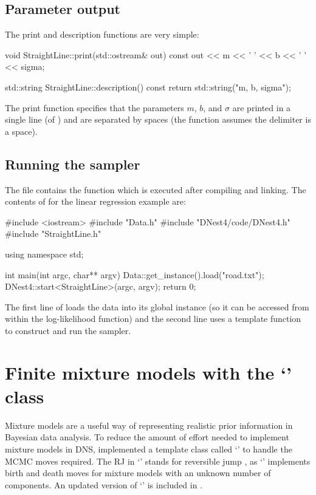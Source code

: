 \documentclass[article]{jss}
\begin{document}
\subsection{Parameter output}
The print and description functions are very simple:
%
\begin{CodeChunk}
\begin{CodeInput}
void StraightLine::print(std::ostream& out) const
{
    out << m << ' ' << b << ' ' << sigma;
}

std::string StraightLine::description() const
{
    return std::string("m, b, sigma");
}
\end{CodeInput}
\end{CodeChunk}
%
The print function specifies that the parameters
$m$, $b$, and $\sigma$ are printed in a single line
(of ) and are separated by spaces (the
 function assumes the delimiter is a space).

\subsection{Running the sampler}
The file  contains the  function which
is executed after compiling and linking. The contents of 
for the linear regression example are:
%
\begin{CodeChunk}
\begin{CodeInput}
#include <iostream>
#include "Data.h"
#include "DNest4/code/DNest4.h"
#include "StraightLine.h"

using namespace std;

int main(int argc, char** argv)
{
    Data::get_instance().load("road.txt");
    DNest4::start<StraightLine>(argc, argv);
    return 0;
}
\end{CodeInput}
\end{CodeChunk}
%
The first line of  loads the data into its global instance
(so it can be accessed from within the log-likelihood function)
and the second line uses a  template function to construct
and run the sampler.

\section[Finite mixture models with the `RJObject' class]{Finite mixture models with the `' class}
Mixture models are a useful way of representing realistic prior information
in Bayesian data analysis. To reduce the amount of effort needed to
implement mixture models in DNS, \citet{brewer2014inference} implemented
a template class called `' to handle the MCMC moves
required. The RJ in `' stands for reversible jump
\citep{green1995reversible}, as
`' implements birth and death moves for mixture
models with an unknown number of components. An updated version of
`' is included in .
\end{document}
